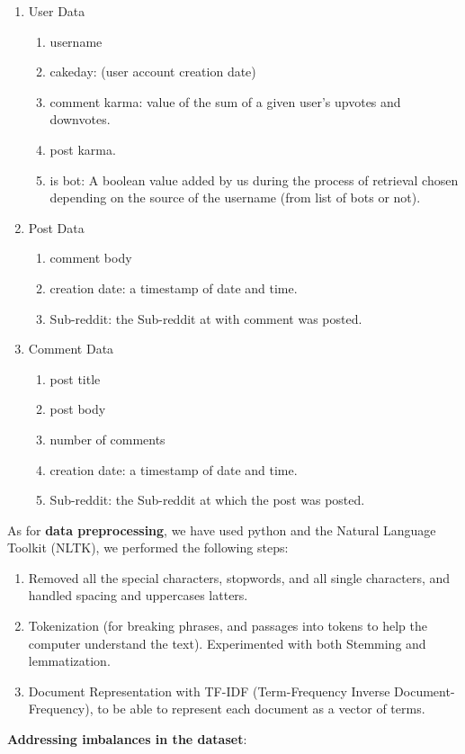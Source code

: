 \documentclass{article}
\begin{document}
    \begin{enumerate}
        \item User Data
            \begin{enumerate}
                \item username
                \item cakeday: (user account creation date)
                \item comment karma: value of the sum of a given user's upvotes and downvotes.
                \item post karma.
                \item is bot: A boolean value added by us during the process of retrieval chosen depending on the source of the username (from list of bots or not).
            \end{enumerate}
        \item Post Data
            \begin{enumerate}
                \item comment body
                \item creation date: a timestamp of date and time.
                \item Sub-reddit: the Sub-reddit at with comment was posted.
            \end{enumerate}
        \item Comment Data
            \begin{enumerate}
                \item post title
                \item post body
                \item number of comments
                \item creation date: a timestamp of date and time.
                \item Sub-reddit: the Sub-reddit at which the post was posted.
            \end{enumerate}
    \end{enumerate}
As for \textbf{data preprocessing}, we have used  python and the Natural Language Toolkit (NLTK), we performed the following steps:\\
\begin{enumerate}
    \item Removed all the special characters, stopwords, and all single characters,  and handled spacing and uppercases latters.
    \item Tokenization (for breaking phrases, and passages into tokens to help the computer understand the text). Experimented with both Stemming and lemmatization.
    \item Document Representation with TF-IDF (Term-Frequency Inverse Document-Frequency), to be able to represent each document as a vector of terms.
\end{enumerate}
\textbf{Addressing imbalances in the dataset}:\\
\end{document}
